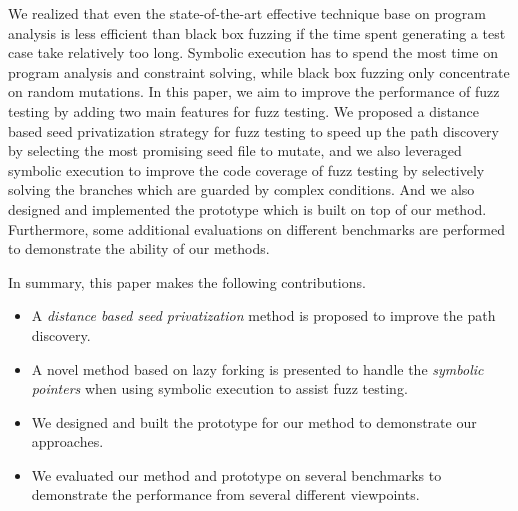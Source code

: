 We realized that even the state-of-the-art effective technique base on program analysis is less efficient than black box fuzzing if the time spent generating a test case take relatively too long. Symbolic execution has to spend the most time on program analysis and constraint solving, while black box fuzzing only concentrate on random mutations. 
In this paper, we aim to improve the performance of fuzz testing by adding two main features for fuzz testing. We proposed a distance based seed privatization strategy for fuzz testing to speed up the path discovery by selecting the most promising seed file to mutate, and we also leveraged symbolic execution to improve the code coverage of fuzz testing by selectively solving the branches which are guarded by complex conditions. And we also designed and implemented the prototype which is built on top of our method. Furthermore, some additional evaluations on different benchmarks are performed to demonstrate the ability of our methods.
 
In summary, this paper makes the following contributions.
\begin{itemize}
\item A \emph{distance based seed privatization} method is proposed to improve the path discovery.

\item A novel method based on lazy forking is presented to handle the \emph{symbolic pointers} when using symbolic execution to assist fuzz testing.

\item We designed and built the prototype for our method to demonstrate our approaches.

\item We evaluated our method and prototype on several benchmarks to demonstrate the performance from several different viewpoints.
\end{itemize}
